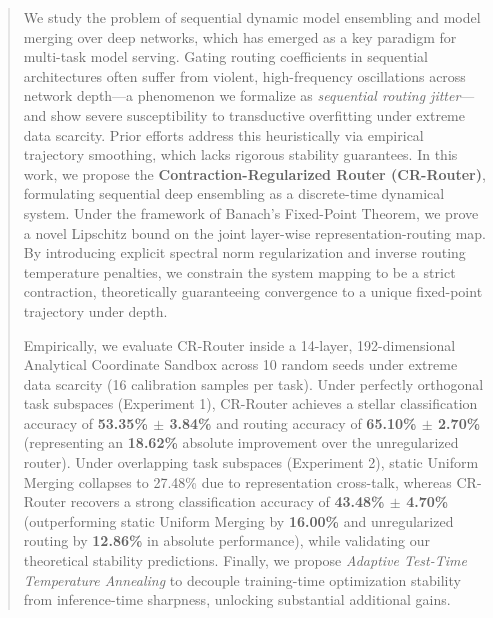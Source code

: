 \begin{abstract}
We study the problem of sequential dynamic model ensembling and model merging over deep networks,
which has emerged as a key paradigm for multi-task model serving. Gating routing coefficients
in sequential architectures often suffer from violent, high-frequency oscillations across
network depth---a phenomenon we formalize as \emph{sequential routing jitter}---and show
severe susceptibility to transductive overfitting under extreme data scarcity. Prior efforts
address this heuristically via empirical trajectory smoothing, which lacks rigorous
stability guarantees. In this work, we propose the \textbf{Contraction-Regularized Router (CR-Router)},
formulating sequential deep ensembling as a discrete-time dynamical system. Under the framework
of Banach's Fixed-Point Theorem, we prove a novel Lipschitz bound on the joint layer-wise
representation-routing map. By introducing explicit spectral norm regularization and inverse
routing temperature penalties, we constrain the system mapping to be a strict contraction,
theoretically guaranteeing convergence to a unique fixed-point trajectory under depth.

Empirically, we evaluate CR-Router inside a 14-layer, 192-dimensional Analytical Coordinate
Sandbox across 10 random seeds under extreme data scarcity (16 calibration samples per task).
Under perfectly orthogonal task subspaces (Experiment 1), CR-Router achieves a stellar
classification accuracy of \textbf{53.35\% $\pm$ 3.84\%} and routing accuracy of
\textbf{65.10\% $\pm$ 2.70\%} (representing an \textbf{18.62\%} absolute improvement over the
unregularized router). Under overlapping task subspaces (Experiment 2), static Uniform Merging
collapses to 27.48\% due to representation cross-talk, whereas CR-Router recovers a strong
classification accuracy of \textbf{43.48\% $\pm$ 4.70\%} (outperforming static Uniform Merging
by \textbf{16.00\%} and unregularized routing by \textbf{12.86\%} in absolute performance), while
validating our theoretical stability predictions. Finally, we propose \emph{Adaptive Test-Time Temperature Annealing}
to decouple training-time optimization stability from inference-time sharpness, unlocking substantial additional gains.
\end{abstract}